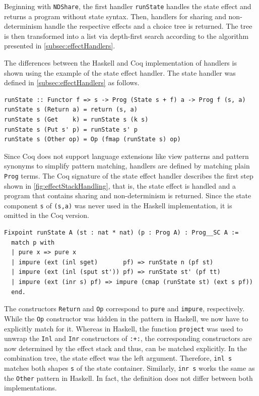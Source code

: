 \documentclass[a4paper, 11pt, fleqn, twoside]{scrreprt}
\newcommand{\hinl}[1]{\texttt{#1}}
\newcommand{\cinl}[1]{\texttt{#1}}
\begin{document}
Beginning with \cinl{NDShare}, the first handler \cinl{runState} handles the state effect and returns a program without state syntax.
Then, handlers for sharing and non-determinism handle the respective effects and a choice tree is returned.
The tree is then transformed into a list via depth-first search according to the algorithm presented in \autoref{subsec:effectHandlers}.

The differences between the Haskell and Coq implementation of handlers is shown using the example of the state effect handler.
The state handler was defined in \autoref{subsec:effectHandlers} as follows.

\begin{verbatim}
runState :: Functor f => s -> Prog (State s + f) a -> Prog f (s, a)
runState s (Return a) = return (s, a)
runState s (Get    k) = runState s (k s)
runState s (Put s' p) = runState s' p
runState s (Other op) = Op (fmap (runState s) op)
\end{verbatim}

Since Coq does not support language extensions like view patterns and pattern synonyms to simplify pattern matching, handlers are defined by matching plain \cinl{Prog} terms.
The Coq signature of the state effect handler describes the first step shown in \autoref{fig:effectStackHandling}, that is, the state effect is handled and a program that contains sharing and non-determinism is returned.
Since the state component \hinl{s} of \hinl{(s,a)} was never used in the Haskell implementation, it is omitted in the Coq version.

\begin{verbatim}
Fixpoint runState A (st : nat * nat) (p : Prog A) : Prog__SC A :=
  match p with
  | pure x => pure x
  | impure (ext (inl sget)       pf) => runState n (pf st)
  | impure (ext (inl (sput st')) pf) => runState st' (pf tt)
  | impure (ext (inr s) pf) => impure (cmap (runState st) (ext s pf))
  end.
\end{verbatim}

The constructors \hinl{Return} and \hinl{Op} correspond to \cinl{pure} and \cinl{impure}, respectively.
While the \hinl{Op} constructor was hidden in the pattern in Haskell, we now have to explicitly match for it.
Whereas in Haskell, the function \hinl{project} was used to unwrap the \hinl{Inl} and \hinl{Inr} constructors of \hinl{:+:}, the corresponding constructors are now determined by the effect stack and thus, can be matched explicitly.
In the combination tree, the state effect was the left argument.
Therefore, \cinl{inl s} matches both shapes \cinl{s} of the state container.
Similarly, \cinl{inr s} works the same as the \hinl{Other} pattern in Haskell.
In fact, the definition does not differ between both implementations.
\end{document}

